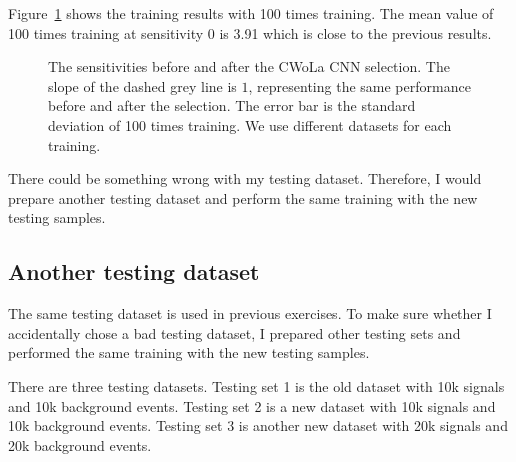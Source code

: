 \documentclass[12pt]{article}
\begin{document}
        Figure~\ref{fig:sensitivity_improvement_100_random_seed} shows the training results with 100 times training. The mean value of 100 times training at sensitivity 0 is 3.91 which is close to the previous results.
        \begin{figure}[htpb]
            \centering
            \caption{The sensitivities before and after the CWoLa CNN selection. The slope of the dashed grey line is $1$, representing the same performance before and after the selection. The error bar is the standard deviation of 100 times training. We use different datasets for each training.}
            \label{fig:sensitivity_improvement_100_random_seed}
        \end{figure}

        There could be something wrong with my testing dataset. Therefore, I would prepare another testing dataset and perform the same training with the new testing samples.
    \subsection{Another testing dataset}%
    \label{sub:another_testing_dataset}
        The same testing dataset is used in previous exercises. To make sure whether I accidentally chose a bad testing dataset, I prepared other testing sets and performed the same training with the new testing samples.

        There are three testing datasets. Testing set 1 is the old dataset with 10k signals and 10k background events. Testing set 2 is a new dataset with 10k signals and 10k background events. Testing set 3 is another new dataset with 20k signals and 20k background events.
\end{document}

